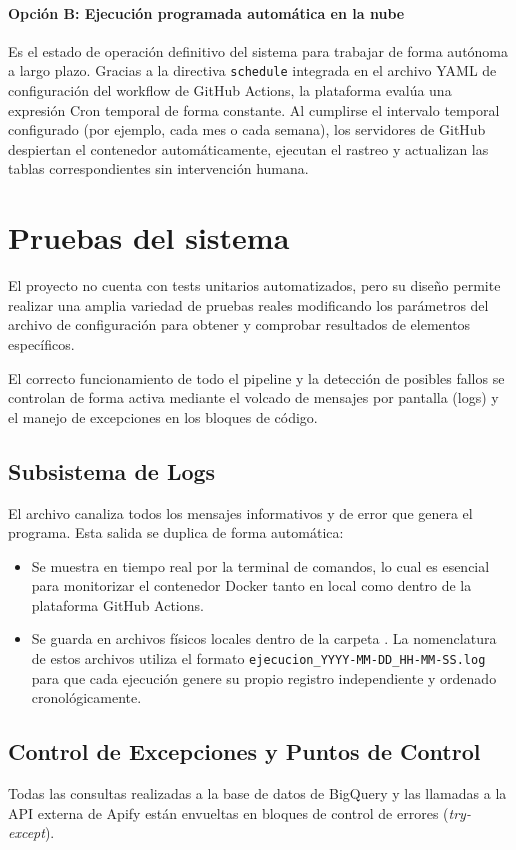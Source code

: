 \paragraph{Opción B: Ejecución programada automática en la nube}
Es el estado de operación definitivo del sistema para trabajar de forma autónoma a largo plazo. Gracias a la directiva \texttt{schedule} integrada en el archivo YAML de configuración del workflow de GitHub Actions, la plataforma evalúa una expresión Cron temporal de forma constante. Al cumplirse el intervalo temporal configurado (por ejemplo, cada mes o cada semana), los servidores de GitHub despiertan el contenedor automáticamente, ejecutan el rastreo y actualizan las tablas correspondientes sin intervención humana.

\section{Pruebas del sistema}
El proyecto no cuenta con tests unitarios automatizados, pero su diseño permite realizar una amplia variedad de pruebas reales modificando los parámetros del archivo de configuración para obtener y comprobar resultados de elementos específicos.

El correcto funcionamiento de todo el pipeline y la detección de posibles fallos se controlan de forma activa mediante el volcado de mensajes por pantalla (logs) y el manejo de excepciones en los bloques de código.

\subsection{Subsistema de Logs}
El archivo  canaliza todos los mensajes informativos y de error que genera el programa. Esta salida se duplica de forma automática:
\begin{itemize}
	\tightlist
	\item Se muestra en tiempo real por la terminal de comandos, lo cual es esencial para monitorizar el contenedor Docker tanto en local como dentro de la plataforma GitHub Actions.
	\item Se guarda en archivos físicos locales dentro de la carpeta . La nomenclatura de estos archivos utiliza el formato \texttt{ejecucion\_YYYY-MM-DD\_HH-MM-SS.log} para que cada ejecución genere su propio registro independiente y ordenado cronológicamente.
\end{itemize}

\subsection{Control de Excepciones y Puntos de Control}
Todas las consultas realizadas a la base de datos de BigQuery y las llamadas a la API externa de Apify están envueltas en bloques de control de errores (\textit{try-except}). 

